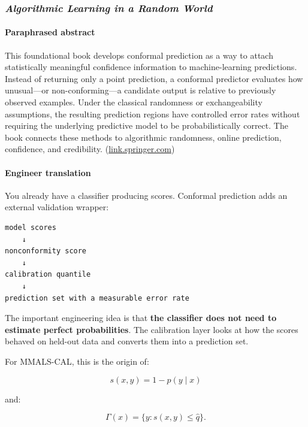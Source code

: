 \subsubsection{\texorpdfstring{\emph{Algorithmic Learning in a Random World}}{Algorithmic Learning in a Random World}}\label{algorithmic-learning-in-a-random-world}

\paragraph{Paraphrased abstract}\label{paraphrased-abstract}

This foundational book develops conformal prediction as a way to attach statistically meaningful confidence information to machine-learning predictions. Instead of returning only a point prediction, a conformal predictor evaluates how unusual---or non-conforming---a candidate output is relative to previously observed examples. Under the classical randomness or exchangeability assumptions, the resulting prediction regions have controlled error rates without requiring the underlying predictive model to be probabilistically correct. The book connects these methods to algorithmic randomness, online prediction, confidence, and credibility. (\href{https://link.springer.com/book/10.1007/b106715?utm_source=chatgpt.com}{link.springer.com})

\paragraph{Engineer translation}\label{engineer-translation}

You already have a classifier producing scores. Conformal prediction adds an external validation wrapper:

\begin{lstlisting}
model scores
    ↓
nonconformity score
    ↓
calibration quantile
    ↓
prediction set with a measurable error rate
\end{lstlisting}

The important engineering idea is that \textbf{the classifier does not need to estimate perfect probabilities}. The calibration layer looks at how the scores behaved on held-out data and converts them into a prediction set.

For MMALS-CAL, this is the origin of:

\[
s(x,y)=1-p(y\mid x)
\]

and:

\[
\Gamma(x)=\{y:s(x,y)\leq\widehat q\}.
\]

